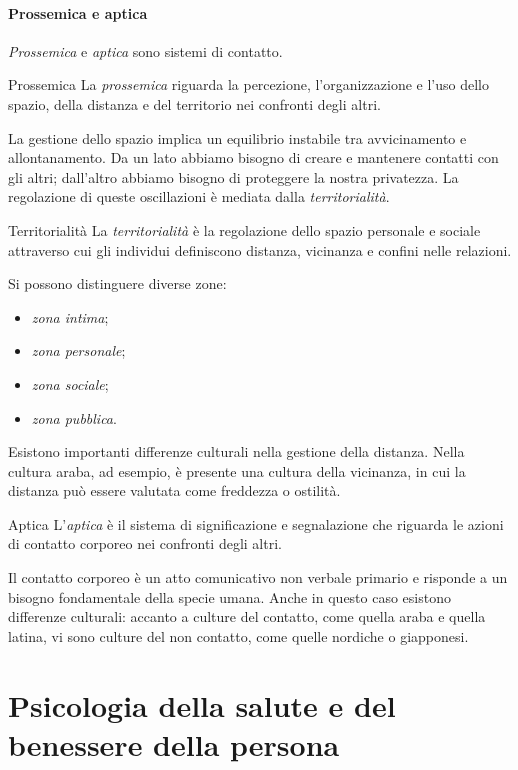 \documentclass[a4paper]{article}
\begin{document}
\paragraph{Prossemica e aptica}
\emph{Prossemica} e \emph{aptica} sono sistemi di contatto.
\begin{snippetdefinition}{Prossemica}
    La \emph{prossemica} riguarda la percezione, l'organizzazione e l'uso dello spazio, della distanza e del territorio nei confronti degli altri.
\end{snippetdefinition}
La gestione dello spazio implica un equilibrio instabile tra avvicinamento e allontanamento. Da un lato abbiamo bisogno di creare e mantenere contatti con gli altri; dall'altro abbiamo bisogno di proteggere la nostra privatezza.
La regolazione di queste oscillazioni è mediata dalla \emph{territorialità}.
\begin{snippetdefinition}{Territorialità}
    La \emph{territorialità} è la regolazione dello spazio personale e sociale attraverso cui gli individui definiscono distanza, vicinanza e confini nelle relazioni.
\end{snippetdefinition}
Si possono distinguere diverse zone:
\begin{itemize}
    \item \emph{zona intima};
    \item \emph{zona personale};
    \item \emph{zona sociale};
    \item \emph{zona pubblica}.
\end{itemize}
Esistono importanti differenze culturali nella gestione della distanza. Nella cultura araba, ad esempio, è presente una cultura della vicinanza, in cui la distanza può essere valutata come freddezza o ostilità.
\begin{snippetdefinition}{Aptica}
    L'\emph{aptica} è il sistema di significazione e segnalazione che riguarda le azioni di contatto corporeo nei confronti degli altri.
\end{snippetdefinition}
Il contatto corporeo è un atto comunicativo non verbale primario e risponde a un bisogno fondamentale della specie umana. Anche in questo caso esistono differenze culturali: accanto a culture del contatto, come quella araba e quella latina, vi sono culture del non contatto, come quelle nordiche o giapponesi.

\section{Psicologia della salute e del benessere della persona}
\end{document}
